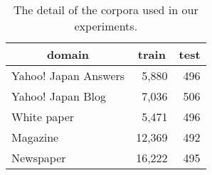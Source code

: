 \documentclass[11pt,letterpaper]{article}
\begin{document}
\begin{table}[t]
 \begin{center}                                                                                                                                                                                                                                                                                                             
\caption{The detail of the corpora used in our experiments.}                                                                                                                                                                                                                                                                                 
\label{bccwj}                                                                                                                                                                                                                                                                                                              
 \begin{tabular}{p{45mm} rr}                                                                                                                                  
  \toprule                                                                                                                                                    
        \multicolumn{1}{c}{domain} & \multicolumn{1}{c}{train} &\multicolumn{1}{c}{test} \\                                                                                             
        \midrule                                                                                                                                                                                                                                                                                                            
    Yahoo! Japan Answers  &5,880&496 \\    
    Yahoo! Japan Blog&7,036&506\\                                                                                                                                  
    White paper&5,471 &496 \\                                                                 
    Magazine &12,369 &492  \\   
    Newspaper &16,222 &495\\                                                                                                                                

\end{tabular}
\end{center}
\end{table}
\end{document}
